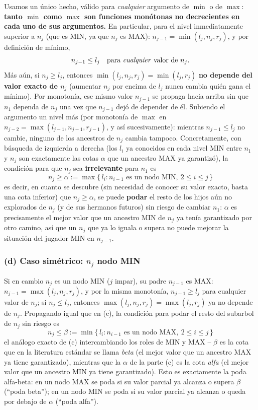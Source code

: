 \documentclass[11pt,onecolumn,letterpaper]{article}
\begin{document}
Usamos un \'unico hecho, v\'alido para \emph{cualquier} argumento de $\min$ o de $\max$:
\textbf{tanto $\min$ como $\max$ son funciones mon\'otonas no decrecientes en cada uno de
sus argumentos.} En particular, para el nivel inmediatamente superior a $n_j$ (que es
MIN, ya que $n_j$ es MAX): $n_{j-1}=\min(l_j,n_j,r_j)$, y por definici\'on de m\'inimo,
$$
n_{j-1}\le l_j \quad\text{para \emph{cualquier} valor de }n_j.
$$
M\'as a\'un, si $n_j \ge l_j$, entonces $\min(l_j,n_j,r_j)=\min(l_j,r_j)$
\textbf{no depende del valor exacto de $n_j$} (aumentar $n_j$ por encima de $l_j$ nunca
cambia qui\'en gana el m\'inimo). Por monoton\'ia, ese mismo valor $n_{j-1}$ se propaga hacia
arriba sin que $n_1$ dependa de $n_j$ una vez que $n_{j-1}$ dej\'o de depender de \'el.
Subiendo el argumento un nivel m\'as (por monoton\'ia de $\max$ en $n_{j-2}=\max(l_{j-1},
n_{j-1},r_{j-1})$, y as\'i sucesivamente): mientras $n_{j-1}\le l_j$ no cambie, ninguno de
los ancestros de $n_j$ cambia tampoco. Concretamente, con b\'usqueda de izquierda a
derecha (los $l_i$ ya conocidos en cada nivel MIN entre $n_1$ y $n_j$ son exactamente las
cotas $\alpha$ que un ancestro MAX ya garantiz\'o), la condici\'on para que $n_j$ sea
\textbf{irrelevante} para $n_1$ es
$$
\boxed{\,n_j \ge \alpha := \max\{\, l_i : n_{i-1}\text{ es un nodo MIN},\ 2\le i\le j\,\}\,}
$$
es decir, en cuanto se descubre (sin necesidad de conocer su valor exacto, basta una cota
inferior) que $n_j \ge \alpha$, se puede \textbf{podar} el resto de los hijos a\'un no
explorados de $n_j$ (y de sus hermanos futuros) sin riesgo de cambiar $n_1$: $\alpha$ es
precisamente el mejor valor que un ancestro MIN de $n_j$ ya ten\'ia garantizado por otro
camino, as\'i que un $n_j$ que ya lo iguala o supera no puede mejorar la situaci\'on del
jugador MIN en $n_{j-1}$.

\subsubsection*{(d) Caso sim\'etrico: $n_j$ nodo MIN}

Si en cambio $n_j$ es un nodo MIN ($j$ impar), su padre $n_{j-1}$ es MAX:
$n_{j-1}=\max(l_j,n_j,r_j)$, y por la misma monoton\'ia, $n_{j-1}\ge l_j$ para cualquier
valor de $n_j$; si $n_j\le l_j$, entonces $\max(l_j,n_j,r_j)=\max(l_j,r_j)$ ya no depende
de $n_j$. Propagando igual que en (c), la condici\'on para podar el resto del subarbol de
$n_j$ sin riesgo es
$$
\boxed{\,n_j \le \beta := \min\{\, l_i : n_{i-1}\text{ es un nodo MAX},\ 2\le i\le j\,\}\,}
$$
el an\'alogo exacto de (c) intercambiando los roles de MIN y MAX -- $\beta$ es la cota que
en la literatura est\'andar se llama \emph{beta} (el mejor valor que un ancestro MAX ya
tiene garantizado), mientras que la $\alpha$ de la parte (c) es la cota \emph{alfa}
(el mejor valor que un ancestro MIN ya tiene garantizado). Esto es exactamente la poda
alfa-beta: en un nodo MAX se poda si su valor parcial ya alcanza o supera $\beta$
(``poda beta''); en un nodo MIN se poda si su valor parcial ya alcanza o queda por debajo
de $\alpha$ (``poda alfa'').
\end{document}
